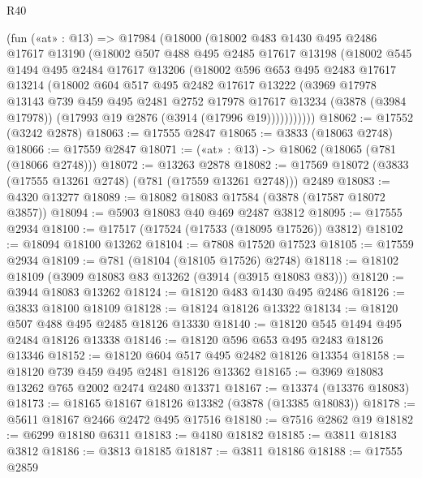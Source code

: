 \begin{lexlean}{R40}
\begin{coremodule}
    (fun («at» : @13) =>
    @17984
      (@18000
        (@18002
          @483
          @1430
          @495
          @2486
          @17617
          @13190
          (@18002
            @507
            @488
            @495
            @2485
            @17617
            @13198
            (@18002
              @545
              @1494
              @495
              @2484
              @17617
              @13206
              (@18002
                @596
                @653
                @495
                @2483
                @17617
                @13214
                (@18002
                  @604
                  @517
                  @495
                  @2482
                  @17617
                  @13222
                  (@3969
                    @17978
                    @13143
                    @739
                    @459
                    @495
                    @2481
                    @2752
                    @17978
                    @17617
                    @13234
                    (@3878 (@3984 @17978))
                    (@17993 @19 @2876 (@3914 (@17996 @19)))))))))))
@18062 := @17552 (@3242 @2878)
@18063 := @17555 @2847
@18065 := @3833 (@18063 @2748)
@18066 := @17559 @2847
@18071 := («at» : @13) -> @18062 (@18065 (@781 (@18066 @2748)))
@18072 := @13263 @2878
@18082 := @17569 @18072 (@3833 (@17555 @13261 @2748) (@781 (@17559 @13261 @2748))) @2489
@18083 := @4320 @13277
@18089 := @18082 @18083 @17584 (@3878 (@17587 @18072 @3857))
@18094 := @5903 @18083 @40 @469 @2487 @3812
@18095 := @17555 @2934
@18100 := @17517 (@17524 (@17533 (@18095 @17526)) @3812)
@18102 := @18094 @18100 @13262
@18104 := @7808 @17520 @17523
@18105 := @17559 @2934
@18109 := @781 (@18104 (@18105 @17526) @2748)
@18118 := @18102 @18109 (@3909 @18083 @83 @13262 (@3914 (@3915 @18083 @83)))
@18120 := @3944 @18083 @13262
@18124 := @18120 @483 @1430 @495 @2486
@18126 := @3833 @18100 @18109
@18128 := @18124 @18126 @13322
@18134 := @18120 @507 @488 @495 @2485 @18126 @13330
@18140 := @18120 @545 @1494 @495 @2484 @18126 @13338
@18146 := @18120 @596 @653 @495 @2483 @18126 @13346
@18152 := @18120 @604 @517 @495 @2482 @18126 @13354
@18158 := @18120 @739 @459 @495 @2481 @18126 @13362
@18165 := @3969 @18083 @13262 @765 @2002 @2474 @2480 @13371
@18167 := @13374 (@13376 @18083)
@18173 := @18165 @18167 @18126 @13382 (@3878 (@13385 @18083))
@18178 := @5611 @18167 @2466 @2472 @495 @17516
@18180 := @7516 @2862 @19
@18182 := @6299 @18180 @6311
@18183 := @4180 @18182
@18185 := @3811 @18183 @3812
@18186 := @3813 @18185
@18187 := @3811 @18186
@18188 := @17555 @2859

\end{coremodule}
\end{lexlean}
